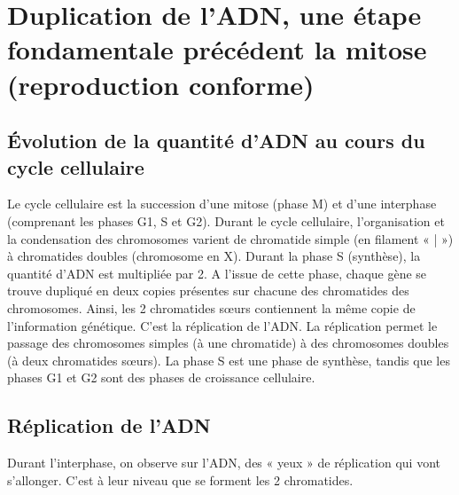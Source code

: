 \section{Duplication de l'ADN, une étape fondamentale précédent la mitose (reproduction conforme)}
\subsection{Évolution de la quantité d'ADN au cours du cycle cellulaire}
Le cycle cellulaire est la succession d'une mitose (phase M) et d'une interphase (comprenant les phases G1, S et G2). Durant le cycle cellulaire, l'organisation et la condensation des chromosomes varient de chromatide simple (en filament « | ») à chromatides doubles (chromosome en X).
Durant la phase S (synthèse), la quantité d'ADN est multipliée par 2. A l’issue de cette phase, chaque gène se trouve dupliqué en deux copies présentes sur chacune des chromatides des chromosomes. Ainsi, les 2 chromatides sœurs contiennent la même copie de l'information génétique. C'est la réplication de l’ADN. 
La réplication permet le passage des chromosomes simples (à une chromatide) à des chromosomes doubles (à deux chromatides sœurs).
La phase S est une phase de synthèse, tandis que les phases G1 et G2 sont des phases de croissance cellulaire. 
\subsection{Réplication de l'ADN}
Durant l'interphase, on observe sur l'ADN, des « yeux » de réplication qui vont s'allonger. C'est à leur niveau que se forment les 2 chromatides.



